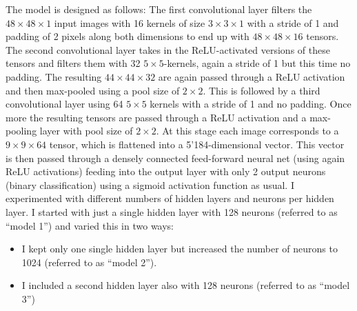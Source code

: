 \documentclass{article}
\begin{document}
The model is designed as follows: The first convolutional layer filters the $48\times48\times1$ input images with 16 kernels of size $3\times3\times1$ with a stride of 1 and padding of 2 pixels along both dimensions to end up with $48\times48\times16$ tensors. The second convolutional layer takes in the ReLU-activated versions of these tensors and filters them with 32 $5\times5$-kernels, again a stride of 1 but this time no padding. The resulting $44\times44\times32$ are again passed through a ReLU activation and then max-pooled using a pool size of $2\times2$. This is followed by a third convolutional layer using 64 $5\times5$ kernels with a stride of 1 and no padding. Once more the resulting tensors are passed through a ReLU activation and a max-pooling layer with pool size of $2\times2$. At this stage each image corresponds to a $9\times9\times64$ tensor, which is flattened into a 5'184-dimensional vector. This vector is then passed through a densely connected feed-forward neural net (using again ReLU activations) feeding into the output layer with only 2 output neurons (binary classification) using a sigmoid activation function as usual. I experimented with different numbers of hidden layers and neurons per hidden layer. I started with just a single hidden layer with 128 neurons (referred to as ``model 1'') and varied this in two ways:
\begin{itemize}
    \item I kept only one single hidden layer but increased the number of neurons to 1024 (referred to as ``model 2'').
    \item I included a second hidden layer also with 128 neurons (referred to as ``model 3'')
\end{itemize}
\end{document}
